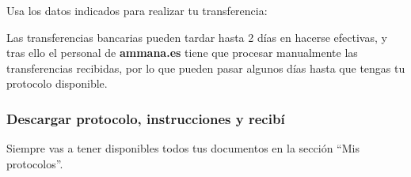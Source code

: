 \documentclass[12pt, spanish]{article}
\begin{document}
\begin{steps}
        \item Usa los datos indicados para realizar tu transferencia:

            \medskip
            \begin{minipage}[t]{\linewidth}
            \raggedright
        \end{minipage}

    \end{steps}

            Las transferencias bancarias pueden tardar hasta 2 días en hacerse efectivas, y tras ello
        el personal de \textbf{ammana.es} tiene que procesar manualmente las transferencias recibidas,
        por lo que pueden pasar algunos días hasta que tengas tu protocolo disponible.


    \subsubsection{Descargar protocolo, instrucciones y recibí}

    \label{sec:download-protocol}

        Siempre vas a tener disponibles todos tus documentos en la sección ``Mis protocolos''.
\end{document}
